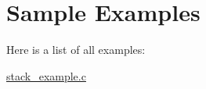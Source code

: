 \section{Sample Examples}
Here is a list of all examples:\begin{CompactItemize}
\item 
\hyperlink{stack__example_8c-example}{stack\_\-example.c}
\end{CompactItemize}
